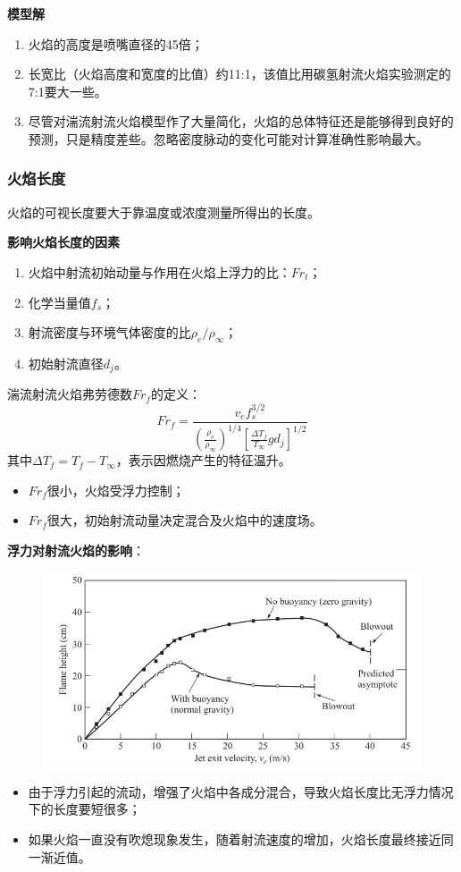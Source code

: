 \textbf{模型解}

\begin{enumerate}
    \item 火焰的高度是喷嘴直径的45倍；
    \item 长宽比（火焰高度和宽度的比值）约11:1，该值比用碳氢射流火焰实验测定的7:1要大一些。
    \item 尽管对湍流射流火焰模型作了大量简化，火焰的总体特征还是能够得到良好的预测，只是精度差些。忽略密度脉动的变化可能对计算准确性影响最大。
\end{enumerate}

\subsubsection{火焰长度}
火焰的可视长度要大于靠温度或浓度测量所得出的长度。

\textbf{影响火焰长度的因素}
\begin{enumerate}
    \item 火焰中射流初始动量与作用在火焰上浮力的比：\(Fr_t\)；
    \item 化学当量值\(f_s\)；
    \item 射流密度与环境气体密度的比\(\rho_e/\rho_\infty\)；
    \item 初始射流直径\(d_j\)。
\end{enumerate}

湍流射流火焰弗劳德数\(Fr_f\)的定义：
\begin{equation}
    Fr_f = \frac{v_e f_s^{3/2}}{{\left(\frac{\rho_e}{\rho_\infty}\right)}^{1/4}{\left[\frac{\Delta T_f}{T_\infty}g d_j\right]}^{1/2}}
\end{equation}
其中\(\Delta T_f = T_f - T_\infty\)，表示因燃烧产生的特征温升。
\begin{itemize}
    \item \(Fr_f\)很小，火焰受浮力控制；
    \item \(Fr_f\)很大，初始射流动量决定混合及火焰中的速度场。
\end{itemize}
\textbf{浮力对射流火焰的影响}：
\begin{figure}[H]
    \includegraphics[width=.3\textwidth]{img/buoyancy.png}
\end{figure}
\begin{itemize}
    \item 由于浮力引起的流动，增强了火焰中各成分混合，导致火焰长度比无浮力情况下的长度要短很多；
    \item 如果火焰一直没有吹熄现象发生，随着射流速度的增加，火焰长度最终接近同一渐近值。
\end{itemize}

